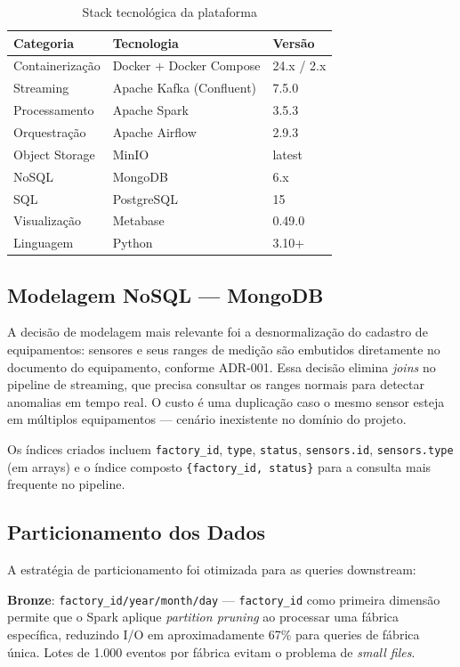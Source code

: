 \begin{table}[h]
\centering
\caption{Stack tecnológica da plataforma}
\label{tab:stack}
\begin{tabular}{|l|l|l|}
\hline
\textbf{Categoria} & \textbf{Tecnologia} & \textbf{Versão} \\
\hline
Containerização & Docker + Docker Compose & 24.x / 2.x \\
\hline
Streaming & Apache Kafka (Confluent) & 7.5.0 \\
\hline
Processamento & Apache Spark & 3.5.3 \\
\hline
Orquestração & Apache Airflow & 2.9.3 \\
\hline
Object Storage & MinIO & latest \\
\hline
NoSQL & MongoDB & 6.x \\
\hline
SQL & PostgreSQL & 15 \\
\hline
Visualização & Metabase & 0.49.0 \\
\hline
Linguagem & Python & 3.10+ \\
\hline
\end{tabular}
\end{table}

\subsection{Modelagem NoSQL — MongoDB}

A decisão de modelagem mais relevante foi a desnormalização do cadastro de equipamentos:
sensores e seus ranges de medição são embutidos diretamente no documento do equipamento,
conforme ADR-001. Essa decisão elimina \textit{joins} no pipeline de streaming, que precisa
consultar os ranges normais para detectar anomalias em tempo real. O custo é uma
duplicação caso o mesmo sensor esteja em múltiplos equipamentos — cenário inexistente
no domínio do projeto.

Os índices criados incluem \texttt{factory\_id}, \texttt{type}, \texttt{status},
\texttt{sensors.id}, \texttt{sensors.type} (em arrays) e o índice composto
\texttt{\{factory\_id, status\}} para a consulta mais frequente no pipeline.

\subsection{Particionamento dos Dados}

A estratégia de particionamento foi otimizada para as queries downstream:

\textbf{Bronze}: \texttt{factory\_id/year/month/day} — \texttt{factory\_id} como
primeira dimensão permite que o Spark aplique \textit{partition pruning} ao processar
uma fábrica específica, reduzindo I/O em aproximadamente 67\% para queries de fábrica
única. Lotes de 1.000 eventos por fábrica evitam o problema de \textit{small files}.

